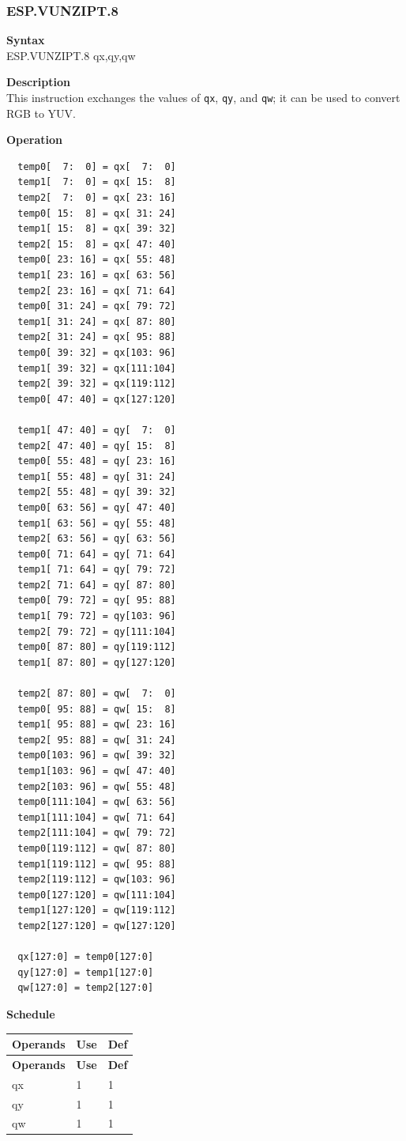 \newpage
\subsubsection{ESP.VUNZIPT.8}\label{instruction:ESPVUNZIPT8}
\textbf{Syntax}\\
ESP.VUNZIPT.8 qx,qy,qw

\textbf{Description}\\
This instruction exchanges the values of \lstinline{qx}, \lstinline{qy}, and \lstinline{qw}; it can be used to convert RGB to YUV.

\textbf{Operation}\\
\begin{lstlisting}
  temp0[  7:  0] = qx[  7:  0]
  temp1[  7:  0] = qx[ 15:  8]
  temp2[  7:  0] = qx[ 23: 16]
  temp0[ 15:  8] = qx[ 31: 24]
  temp1[ 15:  8] = qx[ 39: 32]
  temp2[ 15:  8] = qx[ 47: 40]
  temp0[ 23: 16] = qx[ 55: 48]
  temp1[ 23: 16] = qx[ 63: 56]
  temp2[ 23: 16] = qx[ 71: 64]
  temp0[ 31: 24] = qx[ 79: 72]
  temp1[ 31: 24] = qx[ 87: 80]
  temp2[ 31: 24] = qx[ 95: 88]
  temp0[ 39: 32] = qx[103: 96]
  temp1[ 39: 32] = qx[111:104]
  temp2[ 39: 32] = qx[119:112]
  temp0[ 47: 40] = qx[127:120]

  temp1[ 47: 40] = qy[  7:  0]
  temp2[ 47: 40] = qy[ 15:  8]
  temp0[ 55: 48] = qy[ 23: 16]
  temp1[ 55: 48] = qy[ 31: 24]
  temp2[ 55: 48] = qy[ 39: 32]
  temp0[ 63: 56] = qy[ 47: 40]
  temp1[ 63: 56] = qy[ 55: 48]
  temp2[ 63: 56] = qy[ 63: 56]
  temp0[ 71: 64] = qy[ 71: 64]
  temp1[ 71: 64] = qy[ 79: 72]
  temp2[ 71: 64] = qy[ 87: 80]
  temp0[ 79: 72] = qy[ 95: 88]
  temp1[ 79: 72] = qy[103: 96]
  temp2[ 79: 72] = qy[111:104]
  temp0[ 87: 80] = qy[119:112]
  temp1[ 87: 80] = qy[127:120]

  temp2[ 87: 80] = qw[  7:  0]
  temp0[ 95: 88] = qw[ 15:  8]
  temp1[ 95: 88] = qw[ 23: 16]
  temp2[ 95: 88] = qw[ 31: 24]
  temp0[103: 96] = qw[ 39: 32]
  temp1[103: 96] = qw[ 47: 40]
  temp2[103: 96] = qw[ 55: 48]
  temp0[111:104] = qw[ 63: 56]
  temp1[111:104] = qw[ 71: 64]
  temp2[111:104] = qw[ 79: 72]
  temp0[119:112] = qw[ 87: 80]
  temp1[119:112] = qw[ 95: 88]
  temp2[119:112] = qw[103: 96]
  temp0[127:120] = qw[111:104]
  temp1[127:120] = qw[119:112]
  temp2[127:120] = qw[127:120]

  qx[127:0] = temp0[127:0]
  qy[127:0] = temp1[127:0]
  qw[127:0] = temp2[127:0]

\end{lstlisting}

\textbf{Schedule}\\
\begin{longtable}[c]{|l|l|l|}
    \hline
    \rowcolor{lightgray}
    \textbf{Operands} & \textbf{Use} & \textbf{Def} \\\hline
    \endfirsthead
    \hline
    \rowcolor{lightgray}
     \textbf{Operands} & \textbf{Use} & \textbf{Def} \\\hline
    \endhead
    \hline
    \endfoot

  qx & 1 & 1 \\\hline
  qy & 1 & 1 \\\hline
  qw & 1 & 1

\end{longtable}

